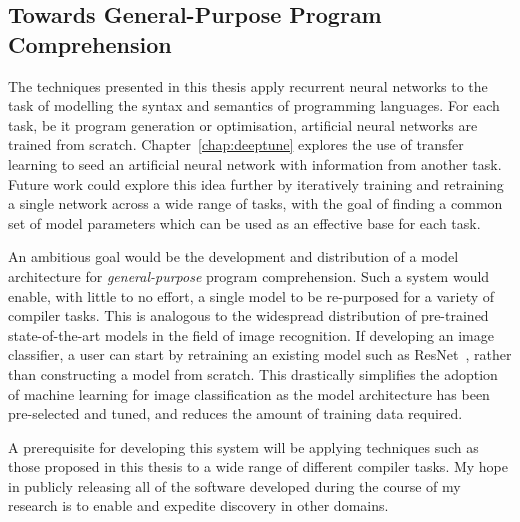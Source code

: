 \subsection{Towards General-Purpose Program Comprehension}

The techniques presented in this thesis apply recurrent neural networks to the task of modelling the syntax and semantics of programming languages. For each task, be it program generation or optimisation, artificial neural networks are trained from scratch. Chapter~\ref{chap:deeptune} explores the use of transfer learning to seed an artificial neural network with information from another task. Future work could explore this idea further by iteratively training and retraining a single network across a wide range of tasks, with the goal of finding a common set of model parameters which can be used as an effective base for each task.

An ambitious goal would be the development and distribution of a model architecture for \emph{general-purpose} program comprehension. Such a system would enable, with little to no effort, a single model to be re-purposed for a variety of compiler tasks. This is analogous to the widespread distribution of pre-trained state-of-the-art models in the field of image recognition. If developing an image classifier, a user can start by retraining an existing model such as ResNet~\cite{He2016}, rather than constructing a model from scratch. This drastically simplifies the adoption of machine learning for image classification as the model architecture has been pre-selected and tuned, and reduces the amount of training data required.

A prerequisite for developing this system will be applying techniques such as those proposed in this thesis to a wide range of different compiler tasks. My hope in publicly releasing all of the software developed during the course of my research is to enable and expedite discovery in other domains.



